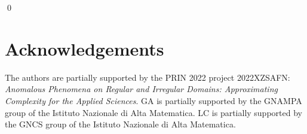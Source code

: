 \documentclass[]{amsart}
\numberwithin{equation}{section}
\theoremstyle{remark}
\theoremstyle{definition}
\DeclareMathOperator{\bP}{\mathbb{P}}
\begin{document}
\hfill \qed
\section*{Acknowledgements}
The authors are partially supported by the PRIN 2022 project 2022XZSAFN: \textit{Anomalous Phenomena on Regular and Irregular Domains: Approximating Complexity for the Applied Sciences}. GA is partially supported by the GNAMPA group of the Istituto Nazionale di Alta Matematica. LC is partially supported by the GNCS group of the Istituto Nazionale di Alta Matematica.



\end{document}
